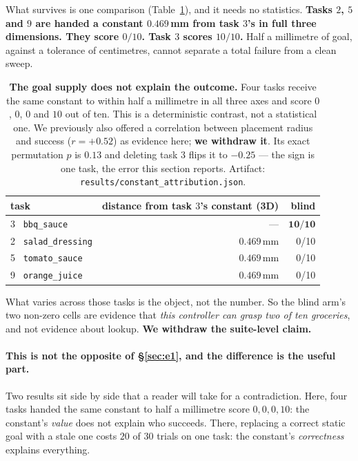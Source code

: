 \documentclass[10pt,twocolumn]{article}
\begin{document}
What survives is one comparison (Table~\ref{tab:attrib}), and it needs no
statistics.
\textbf{Tasks $2$, $5$ and $9$ are handed a constant $0.469$\,mm from task
$3$'s in full three dimensions. They score $0/10$. Task $3$ scores $10/10$.}
Half a millimetre of goal, against a tolerance of centimetres, cannot separate
a total failure from a clean sweep.

\begin{table}[h]\centering\footnotesize
\setlength{\tabcolsep}{4pt}
\begin{tabular}{lrr}
\toprule
task & distance from task $3$'s constant (3D) & blind \\
\midrule
3 \ \texttt{bbq\_sauce} & --- & $\mathbf{10/10}$ \\
2 \ \texttt{salad\_dressing} & $0.469$\,mm & 0/10 \\
5 \ \texttt{tomato\_sauce} & $0.469$\,mm & 0/10 \\
9 \ \texttt{orange\_juice} & $0.469$\,mm & 0/10 \\
\bottomrule
\end{tabular}
\caption{\textbf{The goal supply does not explain the outcome.} Four tasks
receive the same constant to within half a millimetre in all three axes and
score $0$, $0$, $0$ and $10$ out of ten. This is a deterministic contrast, not
a statistical one. We previously also offered a correlation between placement
radius and success ($r = +0.52$) as evidence here; \textbf{we withdraw it}. Its
exact permutation $p$ is $0.13$ and deleting task $3$ flips it to $-0.25$ ---
the sign is one task, the error this section reports.
Artifact: \texttt{results/constant\_attribution.json}.}
\label{tab:attrib}
\end{table}

What varies across those tasks is the object, not the number. So the blind
arm's two non-zero cells are evidence that \emph{this controller can grasp two
of ten groceries}, and not evidence about lookup. \textbf{We withdraw the suite-level claim.}

\paragraph{This is not the opposite of \S\ref{sec:e1}, and the difference is
the useful part.} Two results sit side by side that a reader will take for a
contradiction. Here, four tasks handed the same constant to half a millimetre
score $0,0,0,10$: the constant's \emph{value} does not explain who succeeds.
There, replacing a correct static goal with a stale one costs $20$ of $30$
trials on one task: the constant's \emph{correctness} explains everything.
\end{document}
